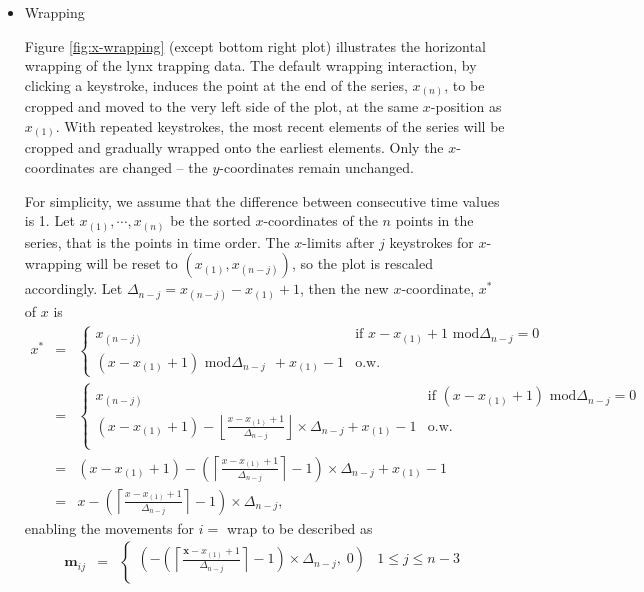 \documentclass[12pt]{article}
\begin{document}
\begin{itemize} \itemsep 0in

\item Wrapping

Figure \ref{fig:x-wrapping} (except bottom right plot)
illustrates the horizontal wrapping of the lynx trapping data.
The default wrapping interaction, by clicking a keystroke,
induces the point at the end of the series, $x_{(n)}$, to be
cropped and moved to the very left side of the plot, at the
same $x$-position as $x_{(1)}$. With repeated keystrokes, the
most recent elements of the series will be cropped and gradually
wrapped onto the earliest elements. Only the $x$-coordinates
are changed -- the $y$-coordinates remain unchanged.

For simplicity, we assume that the difference between consecutive
time values is 1. Let  $x_{(1)},\cdots,x_{(n)}$ be the sorted
$x$-coordinates of the $n$ points in the series, that is the
points in time order. The $x$-limits after $j$ keystrokes for
$x$-wrapping will be reset to $(x_{(1)}, x_{(n-j)})$, so the
plot is rescaled accordingly. Let $\Delta_{n-j}=x_{(n-j)}-x_{(1)}+1$,
then the new $x$-coordinate, $x^*$ of $x$ is
\begin{eqnarray*}
x^* & = & \begin{cases}
x_{(n-j)}  & \mbox{if~} x-x_{(1)}+1 \mbox{~mod}\Delta_{n-j} = 0\\
(x-x_{(1)}+1) \mbox{~mod}\Delta_{n-j} ~~+x_{(1)}-1 &  \mbox{o.w.}
\end{cases} \\ 
& = & \begin{cases}
x_{(n-j)}  & \mbox{if~} (x-x_{(1)}+1) \mbox{~mod}\Delta_{n-j} = 0\\
(x-x_{(1)}+1)-\left\lfloor\frac{x-x_{(1)}+1}{\Delta_{n-j}}\right\rfloor\times\Delta_{n-j}+x_{(1)}-1 &\mbox{o.w.}\\
\end{cases} \\
 & = &
(x-x_{(1)}+1)-\left(\left\lceil\frac{x-x_{(1)}+1}{\Delta_{n-j}}\right\rceil -1\right)\times \Delta_{n-j} +x_{(1)}-1 \\ & = &
x-\left(\left\lceil \frac{x-x_{(1)}+1}{\Delta_{n-j}}\right\rceil -1\right)\times\Delta_{n-j},
\end{eqnarray*}
enabling the movements for $i=$ wrap to be described as
\begin{eqnarray*}
\mathbf{m}{}_{ij} & = & \begin{cases}
(-\left(\left\lceil \frac{\mathbf{x}-x_{(1)}+1}{\Delta_{n-j}}\right\rceil -1\right)\times\Delta_{n-j}, \; 0) & 1\leq j \leq n-3 \\

\end{cases}
\end{eqnarray*}
\end{itemize}
\end{document}
